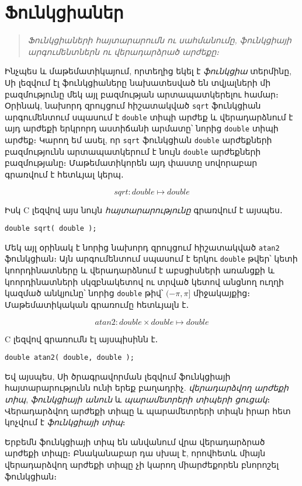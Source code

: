 \chapter{Ֆունկցիաներ}

\begin{quote}
\emph{Ֆունկցիաների հայտարարումն ու սահմանումը, ֆունկցիայի արգումենտներն
ու վերադարձրած արժեքը։}
\end{quote}

Ինչպես և մաթեմատիկայում, որտեղից եկել է \emph{ֆունկցիա} տերմինը, Սի լեզվում
էլ ֆունկցիաները նախատեսված են տվյալների մի բազմությունը մեկ այլ բազմության
արտապատկերելու համար։ Օրինակ, նախորդ զրույցում հիշատակված \texttt{sqrt}
ֆունկցիան արգումենտում սպասում է \texttt{double} տիպի արժեք և վերադարձնում է
այդ արժեքի երկրորդ աստիճանի արմատը՝ նորից \texttt{double} տիպի արժեք։ Կարող
եմ ասել, որ \texttt{sqrt} ֆունկցիան \texttt{double} արժեքների բազմությունն
արտապատկերում է նույն \texttt{double} արժեքների բազմությանը։ Մաթեմատիկորեն
այդ փաստը սովորաբար գրառվում է հետևյալ կերպ․

\[
sqrt : double \mapsto double
\]

Իսկ C լեզվով այս նույն \emph{հայտարարությունը} գրառվում է այսպես․

\begin{Verbatim}
double sqrt( double );
\end{Verbatim}

Մեկ այլ օրինակ է նորից նախորդ զրույցում հիշատակված \texttt{atan2} ֆունկցիան։
Այն արգումենտում սպասում է երկու \texttt{double} թվեր՝ կետի կոորդինատները և
վերադարձնում է աբսցիսների առանցքի և կոորդինատների սկզբնակետով ու տրված կետով
անցնող ուղղի կազմած անկյունը՝ նորից \texttt{double} թիվ՝ \((−\pi, \pi]\)
միջակայքից։ Մաթեմատիկական գրառումը հետևյալն է․

\[
atan2 : double \times double \mapsto double
\]

C լեզվով գրառումն էլ այսպիսինն է․

\begin{Verbatim}
double atan2( double, double );
\end{Verbatim}

Եվ այսպես, Սի ծրագրավորման լեզվում ֆունկցիայի հայտարարությունն ունի երեք
բաղադրիչ. \emph{վերադարձվող արժեքի տիպ}, \emph{ֆունկցիայի անուն} և
\emph{պարամետրերի տիպերի ցուցակ}։ Վերադարձվող արժեքի տիպը և պարամետրերի տիպն
իրար հետ կոչվում է \emph{ֆունկցիայի տիպ}։

Երբեմն ֆունկցիայի տիպ են անվանում վրա վերադարձրած արժեքի տիպը։ Բնականաբար
դա սխալ է, որովհետև միայն վերադարձվող արժեքի տիպը չի կարող միարժեքորեն
բնորոշել ֆունկցիան։

